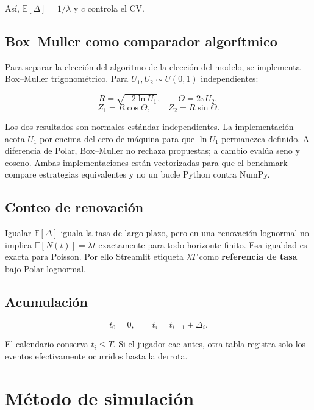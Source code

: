 \documentclass[11pt,a4paper]{article}
\begin{document}
Así, $\mathbb{E}[\Delta]=1/\lambda$ y $c$ controla el CV.

\subsection{Box--Muller como comparador algorítmico}

Para separar la elección del algoritmo de la elección del modelo, se implementa
Box--Muller trigonométrico. Para $U_1,U_2\sim U(0,1)$ independientes:

\begin{equation}
R=\sqrt{-2\ln U_1},\qquad \Theta=2\pi U_2,
\end{equation}
\begin{equation}
Z_1=R\cos\Theta,\qquad Z_2=R\sin\Theta.
\end{equation}

Los dos resultados son normales estándar independientes. La implementación
acota $U_1$ por encima del cero de máquina para que $\ln U_1$ permanezca
definido. A diferencia de Polar, Box--Muller no rechaza propuestas; a cambio
evalúa seno y coseno. Ambas implementaciones están vectorizadas para que el
benchmark compare estrategias equivalentes y no un bucle Python contra NumPy.

\subsection{Conteo de renovación}

Igualar $\mathbb{E}[\Delta]$ iguala la tasa de largo plazo, pero en una
renovación lognormal no implica
$\mathbb{E}[N(t)]=\lambda t$ exactamente para todo horizonte finito. Esa
igualdad es exacta para Poisson. Por ello Streamlit etiqueta $\lambda T$ como
\textbf{referencia de tasa} bajo Polar-lognormal.

\subsection{Acumulación}

\begin{equation}
t_0=0,\qquad t_i=t_{i-1}+\Delta_i.
\end{equation}

El calendario conserva $t_i\leq T$. Si el jugador cae antes, otra tabla registra
solo los eventos efectivamente ocurridos hasta la derrota.

\section{Método de simulación}
\end{document}
